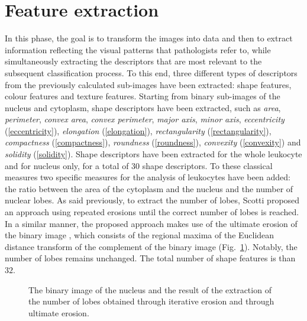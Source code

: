 \documentclass[final,a4paper,12pt,english]{UnicaPhdThesis3}
\begin{document}
	\section{Feature extraction}
	In this phase, the goal is to transform the images into data and then to extract information reflecting the visual patterns that pathologists refer to, while simultaneously extracting  the descriptors  that  are most relevant to the subsequent classification process. To this end, three different types of descriptors from the previously calculated sub-images have been extracted:  shape features, colour features and texture  features. Starting  from binary sub-images of the nucleus and cytoplasm, shape descriptors have been extracted, such as \textit{area}, \textit{perimeter}, \textit{convex area}, \textit{convex perimeter}, \textit{major axis}, \textit{minor axis}, \textit{eccentricity} (\ref{eccentricity}), \textit{elongation} (\ref{elongation}), \textit{rectangularity} (\ref{rectangularity}), \textit{compactness} (\ref{compactness}), \textit{roundness} (\ref{roundness}), \textit{convexity} (\ref{convexity}) and \textit{solidity} (\ref{solidity}). Shape descriptors have been extracted for the whole leukocyte and for nucleus only, for a total of $30$ shape descriptors. To these classical measures two specific measures for the analysis of leukocytes have been added: the ratio between the area of the cytoplasm and the nucleus and the number of nuclear lobes. As said previously, to extract the number of lobes, Scotti \cite{Sco06} proposed an approach using repeated erosions until  the correct number of lobes is reached. In a similar manner, the proposed approach makes use of the ultimate erosion of the binary image \cite{Serra,Serra2}, which consists of the regional maxima of the Euclidean distance transform of the complement of the binary image (Fig.~\ref{fig:examplelobes}). Notably, the number of lobes remains unchanged. The total number of shape features is than $32$.
	
	\begin{figure}[!tbp]
		\centering
		\caption{\label{fig:examplelobes}The binary image of the nucleus and the result of the extraction of the number of lobes obtained through iterative erosion and through ultimate erosion. }
	\end{figure}
	
\end{document}
